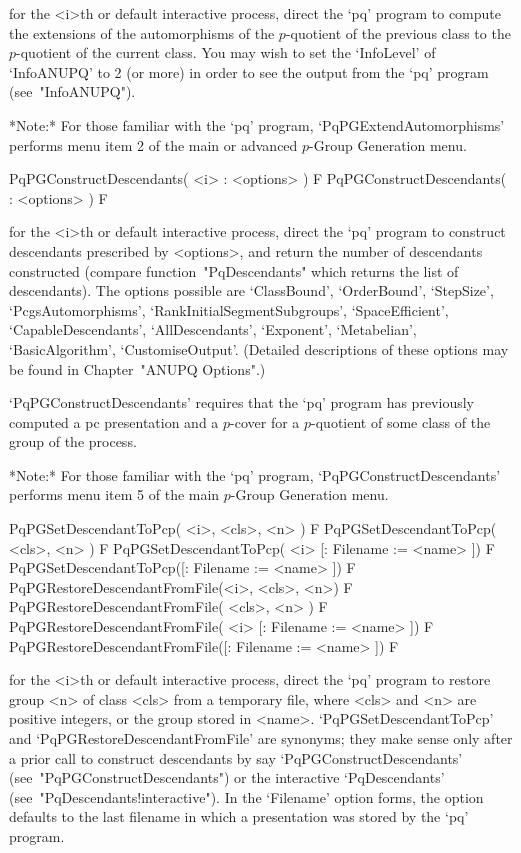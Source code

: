 for the <i>th  or default interactive {\ANUPQ} process,  direct  the `pq'
program  to   compute  the  extensions   of  the  automorphisms   of  the
$p$-quotient of  the previous  class to the  $p$-quotient of  the current
class.  You may wish to set the `InfoLevel' of `InfoANUPQ' to 2 (or more)
in order to see the output from the `pq' program (see~"InfoANUPQ").

*Note:*    
For  those  familiar  with  the  `pq'  program,  `PqPGExtendAutomorphisms'
performs menu item 2 of the main or advanced $p$-Group Generation menu. 

\>PqPGConstructDescendants( <i> : <options> ) F
\>PqPGConstructDescendants( : <options> ) F

for the  <i>th or default  interactive {\ANUPQ} process, direct  the `pq'
program to construct descendants  prescribed by <options>, and return the
number of descendants constructed (compare function~"PqDescendants" which
returns the list of descendants).  The options possible are `ClassBound',
`OrderBound',               `StepSize',              `PcgsAutomorphisms',
`RankInitialSegmentSubgroups',   `SpaceEfficient',  `CapableDescendants',
`AllDescendants',     `Exponent',     `Metabelian',     `BasicAlgorithm',
`CustomiseOutput'.  (Detailed descriptions of  these options may be found
in Chapter~"ANUPQ Options".)

`PqPGConstructDescendants' requires that the `pq' program  has  previously
computed a pc presentation and a $p$-cover for  a  $p$-quotient  of  some
class of the group of the process.

*Note:* 
For those  familiar  with  the  `pq'  program,  `PqPGConstructDescendants'
performs menu item 5 of the main $p$-Group Generation menu.

\>PqPGSetDescendantToPcp( <i>, <cls>, <n> ) F
\>PqPGSetDescendantToPcp( <cls>, <n> ) F
\>PqPGSetDescendantToPcp( <i> [: Filename := <name> ]) F
\>PqPGSetDescendantToPcp([: Filename := <name> ]) F
\>PqPGRestoreDescendantFromFile(<i>, <cls>, <n>) F
\>PqPGRestoreDescendantFromFile( <cls>, <n> ) F
\>PqPGRestoreDescendantFromFile( <i> [: Filename := <name> ]) F
\>PqPGRestoreDescendantFromFile([: Filename := <name> ]) F

for the <i>th or default interactive {\ANUPQ} process,  direct  the  `pq'
program to restore group <n> of class <cls> from a temporary file,  where
<cls> and <n> are positive integers,  or  the  group  stored  in  <name>.
`PqPGSetDescendantToPcp'    and    `PqPGRestoreDescendantFromFile'    are
synonyms;  they  make  sense  only  after  a  prior  call  to   construct
descendants          by          say           `PqPGConstructDescendants'
(see~"PqPGConstructDescendants")  or  the   interactive   `PqDescendants'
(see~"PqDescendants!interactive"). In the `Filename'  option  forms,  the
option defaults to the last filename in which a presentation  was  stored
by the `pq' program.

